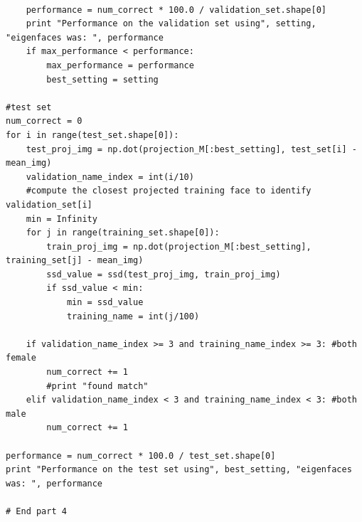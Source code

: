 \documentclass{article}
\begin{document}
\begin{lstlisting}
        
    performance = num_correct * 100.0 / validation_set.shape[0]
    print "Performance on the validation set using", setting, "eigenfaces was: ", performance
    if max_performance < performance:
        max_performance = performance
        best_setting = setting
        
#test set
num_correct = 0
for i in range(test_set.shape[0]):
    test_proj_img = np.dot(projection_M[:best_setting], test_set[i] - mean_img)
    validation_name_index = int(i/10)
    #compute the closest projected training face to identify validation_set[i]
    min = Infinity
    for j in range(training_set.shape[0]):
        train_proj_img = np.dot(projection_M[:best_setting], training_set[j] - mean_img)
        ssd_value = ssd(test_proj_img, train_proj_img)
        if ssd_value < min:
            min = ssd_value
            training_name = int(j/100)

    if validation_name_index >= 3 and training_name_index >= 3: #both female
        num_correct += 1
        #print "found match"
    elif validation_name_index < 3 and training_name_index < 3: #both male
        num_correct += 1
        
performance = num_correct * 100.0 / test_set.shape[0] 
print "Performance on the test set using", best_setting, "eigenfaces was: ", performance

# End part 4
\end{lstlisting}
\end{document}
